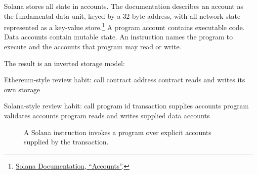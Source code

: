 Solana stores all state in accounts. The documentation describes an account as the fundamental data unit, keyed by a 32-byte address, with all network state represented as a key-value store.\footnote{\href{https://solana.com/docs/core/accounts}{Solana Documentation, ``Accounts''}.} A program account contains executable code. Data accounts contain mutable state. An instruction names the program to execute and the accounts that program may read or write.

The result is an inverted storage model:

\begin{codeblock}
Ethereum-style review habit:
    call contract address
    contract reads and writes its own storage

Solana-style review habit:
    call program id
    transaction supplies accounts
    program validates accounts
    program reads and writes supplied data accounts
\end{codeblock}

\begin{figure}[htbp]
\centering
{}
\caption{A Solana instruction invokes a program over explicit accounts supplied by the transaction.}
\end{figure}


